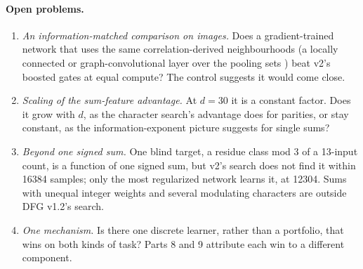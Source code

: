 \paragraph{Open problems.}
\begin{enumerate}
\item \emph{An information-matched comparison on images.} Does a gradient-trained network that uses the same correlation-derived neighbourhoods (a locally connected or graph-convolutional layer over the pooling sets \cite{neyshabur2020convolutions}) beat v2's boosted gates at equal compute? The  control suggests it would come close.
\item \emph{Scaling of the sum-feature advantage.} At $d=30$ it is a constant factor. Does it grow with $d$, as the character search's advantage does for parities, or stay constant, as the information-exponent picture suggests for single sums?
\item \emph{Beyond one signed sum.} One blind target, a residue class mod 3 of a 13-input count, is a function of one signed sum, but v2's search does not find it within 16384 samples; only the most regularized network learns it, at 12304. Sums with unequal integer weights and several modulating characters are outside DFG v1.2's search.
\item \emph{One mechanism.} Is there one discrete learner, rather than a portfolio, that wins on both kinds of task? Parts 8 and 9 attribute each win to a different component.
\end{enumerate}

